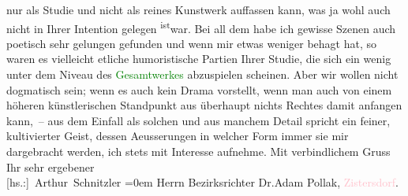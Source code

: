                     nur als Studie und nicht als reines Kunstwerk auffassen kann, was ja wohl auch
                    nicht in Ihrer Intention gelegen \substVorne{}\textsuperscript{ist}\substDazwischen{}war\substHinten{}. Bei all dem habe ich gewisse Szenen auch poetisch sehr gelungen
                    gefunden und wenn mir etwas weniger behagt hat, so waren es vielleicht etliche
                    humoristische Partien Ihrer Studie, die sich ein wenig unter dem Niveau des \textcolor{green}{Gesamtwerkes}{} abzuspielen
                    scheinen. Aber wir wollen nicht dogmatisch sein; wenn {\pb}es auch kein Drama  vorstellt, wenn man
                    auch von einem höheren künstlerischen Standpunkt aus überhaupt nichts Rechtes
                    damit anfangen kann, – aus dem Einfall als solchen und aus manchem Detail
                    spricht ein feiner, kultivierter Geist, dessen Aeusserungen in welcher Form
                    immer sie mir dargebracht werden, ich \introOben{}stets\introOben{} mit
                    Interesse aufnehme.\pend
           \pstart
           Mit verbindlichem Gruss{\\[\baselineskip]}Ihr sehr ergebener{\\[\baselineskip]}\spacefill\mbox{{[}hs.:{]} Arthur Schnitzler}\pend
           \leftskip=0em{}\pstart
           \noindent{}Herrn Bezirksrichter Dr.Adam Pollak, \textcolor{pink}{Zistersdorf}{}\ledrightnote{\textcolor{pink}{Zistersdorf}}.\pend
           \endnumbering{}  
      